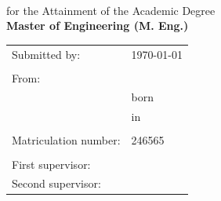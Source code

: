 \begin{titlepage}
\begin{figure}[!h]
	\end{figure}
	\vspace*{4cm}
	\begin{center}
		\Huge
		\textbf{\documentType} \\[4pt]
		\normalsize for the Attainment of the Academic Degree \\[3pt]
		\large \textbf{Master of Engineering (M. Eng.)} \\
		\vspace{2cm}
		\Large \thetitle
		\begin{table}[b]
			\centering
			\begin{tabular}{ll}
				Submitted by: & \today \\
				\\
				From: & \theauthor \\
				& born \birthday \\
				& in \birthplace \\
				\\
				Matriculation number: & 246565 \\
				\\
				First supervisor: & \firstTutor \\
				Second supervisor: & \secondTutor
			\end{tabular}
		\end{table}
	\end{center}
\end{titlepage}
